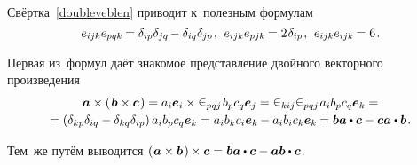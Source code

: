 \begin{otherlanguage}{russian}
Свёртка~\eqref{doubleveblen} приводит к~полезным формулам
\begin{equation}\label{veblencontraction}
e_{ijk} e_{pqk} \hspace{-0.16ex} = \delta_{ip} \delta_{jq} \hspace{-0.2ex} - \delta_{iq} \delta_{jp} \hspace{.2ex}, \:\,
e_{ijk} e_{pjk} \hspace{-0.16ex} = 2 \hspace{.16ex} \delta_{ip} \hspace{.2ex}, \:\,
e_{ijk} e_{ijk} \hspace{-0.16ex} = 6 \hspace{.2ex}.
\end{equation}

Первая из~формул даёт знакомое представление двойного векторного произведения
\[\begin{array}{c}
\bm{a} \times \left(\hspace{0.2ex}{\bm{b} \times \bm{c}}\hspace{0.2ex}\right) = a_i \bm{e}_i \times \levicivita_{pqj} \hspace{.2ex} b_p c_q \bm{e}_j  = \levicivita_{kij} \levicivita_{pqj} \hspace{.2ex} a_i b_p c_q \bm{e}_k = \\[0.2em]
= \left({\delta_{kp}\delta_{iq} - \delta_{kq}\delta_{ip}}\right) a_i b_p c_q \bm{e}_k = a_i b_k c_i \bm{e}_k \hspace{-0.12ex} - a_i b_i c_k \bm{e}_k \hspace{-0.16ex} = \bm{b}\bm{a} \dotp \bm{c} - \bm{c}\bm{a} \dotp \bm{b} \hspace{.16ex}.
\end{array}\]\vspace{-0.6em}

\noindent Тем~же путём выводится ${\left(\hspace{0.1ex} \bm{a} \times \bm{b} \hspace{0.2ex}\right) \hspace{-0.1ex} \times \bm{c} = \bm{b}\bm{a} \dotp \bm{c} - \bm{a}\bm{b} \dotp \bm{c}}$\hspace{.16ex}.


\end{otherlanguage}
